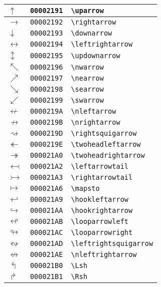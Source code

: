 \begin{longtable}{|l|l|l|}
\hline
$\uparrow$ & \texttt{00002191} & \verb|\uparrow| \\
\hline
$\rightarrow$ & \texttt{00002192} & \verb|\rightarrow| \\
\hline
$\downarrow$ & \texttt{00002193} & \verb|\downarrow| \\
\hline
$\leftrightarrow$ & \texttt{00002194} & \verb|\leftrightarrow| \\
\hline
$\updownarrow$ & \texttt{00002195} & \verb|\updownarrow| \\
\hline
$\nwarrow$ & \texttt{00002196} & \verb|\nwarrow| \\
\hline
$\nearrow$ & \texttt{00002197} & \verb|\nearrow| \\
\hline
$\searrow$ & \texttt{00002198} & \verb|\searrow| \\
\hline
$\swarrow$ & \texttt{00002199} & \verb|\swarrow| \\
\hline
$\nleftarrow$ & \texttt{0000219A} & \verb|\nleftarrow| \\
\hline
$\nrightarrow$ & \texttt{0000219B} & \verb|\nrightarrow| \\
\hline
$\rightsquigarrow$ & \texttt{0000219D} & \verb|\rightsquigarrow| \\
\hline
$\twoheadleftarrow$ & \texttt{0000219E} & \verb|\twoheadleftarrow| \\
\hline
$\twoheadrightarrow$ & \texttt{000021A0} & \verb|\twoheadrightarrow| \\
\hline
$\leftarrowtail$ & \texttt{000021A2} & \verb|\leftarrowtail| \\
\hline
$\rightarrowtail$ & \texttt{000021A3} & \verb|\rightarrowtail| \\
\hline
$\mapsto$ & \texttt{000021A6} & \verb|\mapsto| \\
\hline
$\hookleftarrow$ & \texttt{000021A9} & \verb|\hookleftarrow| \\
\hline
$\hookrightarrow$ & \texttt{000021AA} & \verb|\hookrightarrow| \\
\hline
$\looparrowleft$ & \texttt{000021AB} & \verb|\looparrowleft| \\
\hline
$\looparrowright$ & \texttt{000021AC} & \verb|\looparrowright| \\
\hline
$\leftrightsquigarrow$ & \texttt{000021AD} & \verb|\leftrightsquigarrow| \\
\hline
$\nleftrightarrow$ & \texttt{000021AE} & \verb|\nleftrightarrow| \\
\hline
$\Lsh$ & \texttt{000021B0} & \verb|\Lsh| \\
\hline
$\Rsh$ & \texttt{000021B1} & \verb|\Rsh| \\

\end{longtable}
